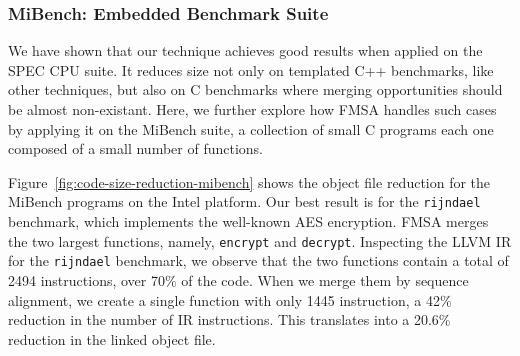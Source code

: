 \subsubsection*{MiBench: Embedded Benchmark Suite}

We have shown that our technique achieves good results when applied on the SPEC
CPU suite. It reduces size not only on templated C++ benchmarks, like other
techniques, but also on C benchmarks where merging opportunities should
be almost non-existant. Here, we further explore how FMSA handles such
cases by applying it on the MiBench suite, a collection of small C programs
each one composed of a small number of functions. 

Figure~\ref{fig:code-size-reduction-mibench} shows the object file reduction
for the MiBench programs on the Intel platform. Our best result is for the \texttt{rijndael} benchmark,
which implements the well-known AES encryption. FMSA merges the two largest functions, namely,
\texttt{encrypt} and \texttt{decrypt}.
Inspecting the LLVM IR for the \texttt{rijndael} benchmark, we observe that
the two functions contain a total of 2494 instructions, over 70\% of the code.
When we merge them by sequence alignment, we create a single function with
only 1445 instruction, a 42\% reduction in the number of IR instructions. This
translates into a 20.6\% reduction in the linked object file.

